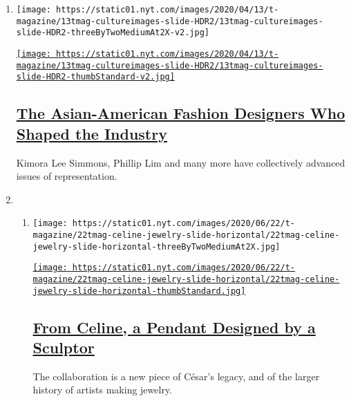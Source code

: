 \begin{enumerate}
\def\labelenumi{\arabic{enumi}.}
\item
  \texttt{[image: https://static01.nyt.com/images/2020/04/13/t-magazine/13tmag-cultureimages-slide-HDR2/13tmag-cultureimages-slide-HDR2-threeByTwoMediumAt2X-v2.jpg]}

  \href{/interactive/2020/04/13/t-magazine/asian-american-fashion-designers.html}{\texttt{[image: https://static01.nyt.com/images/2020/04/13/t-magazine/13tmag-cultureimages-slide-HDR2/13tmag-cultureimages-slide-HDR2-thumbStandard-v2.jpg]}}

  \hypertarget{the-asian-american-fashion-designers-who-shaped-the-industry}{%
  \subsection{\texorpdfstring{\href{/interactive/2020/04/13/t-magazine/asian-american-fashion-designers.html}{The
  Asian-American Fashion Designers Who Shaped the
  Industry}}{The Asian-American Fashion Designers Who Shaped the Industry}}\label{the-asian-american-fashion-designers-who-shaped-the-industry}}

  Kimora Lee Simmons, Phillip Lim and many more have collectively
  advanced issues of representation.
\item
  \begin{enumerate}
  \def\labelenumii{\arabic{enumii}.}
  \item
    \texttt{[image: https://static01.nyt.com/images/2020/06/22/t-magazine/22tmag-celine-jewelry-slide-horizontal/22tmag-celine-jewelry-slide-horizontal-threeByTwoMediumAt2X.jpg]}

    \href{/2020/06/22/t-magazine/celine-cesar-jewelry.html}{\texttt{[image: https://static01.nyt.com/images/2020/06/22/t-magazine/22tmag-celine-jewelry-slide-horizontal/22tmag-celine-jewelry-slide-horizontal-thumbStandard.jpg]}}

    \hypertarget{from-celine-a-pendant-designed-by-a-sculptor}{%
    \subsection{\texorpdfstring{\href{/2020/06/22/t-magazine/celine-cesar-jewelry.html}{From
    Celine, a Pendant Designed by a
    Sculptor}}{From Celine, a Pendant Designed by a Sculptor}}\label{from-celine-a-pendant-designed-by-a-sculptor}}

    The collaboration is a new piece of César's legacy, and of the
    larger history of artists making jewelry.


\end{enumerate}
\end{enumerate}
